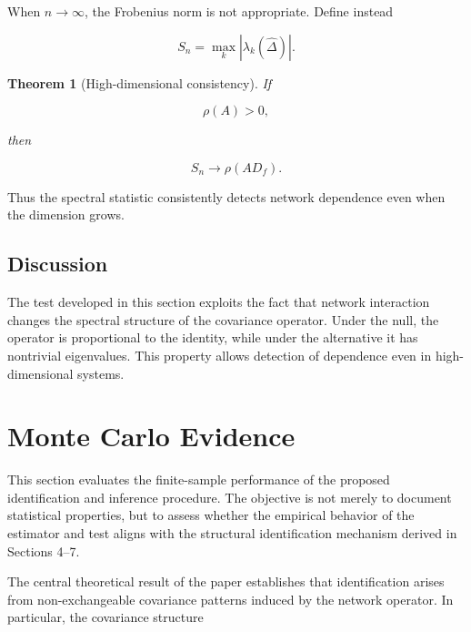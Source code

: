 \documentclass[12pt]{article}
\numberwithin{equation}{section}
\newtheorem{theorem}{Theorem}[section]
\begin{document}
When $n \to \infty$, the Frobenius norm is not appropriate.
Define instead

\begin{equation}
S_n
=
\max_k
|\lambda_k(\hat \Delta)|.
\label{eq:7.high}
\end{equation}

\begin{theorem}[High-dimensional consistency]

If

\begin{equation}
\rho(A) > 0,
\label{eq:7.rho}
\end{equation}

then

\begin{equation}
S_n
\to
\rho(A D_f).
\label{eq:7.speccons}
\end{equation}

\end{theorem}

Thus the spectral statistic consistently detects network dependence even
when the dimension grows.

\subsection{Discussion}

The test developed in this section exploits the fact that network
interaction changes the spectral structure of the covariance operator.
Under the null, the operator is proportional to the identity, while
under the alternative it has nontrivial eigenvalues. This property
allows detection of dependence even in high-dimensional systems.


\section{Monte Carlo Evidence}

This section evaluates the finite-sample performance of the proposed identification and inference procedure. The objective is not merely to document statistical properties, but to assess whether the empirical behavior of the estimator and test aligns with the structural identification mechanism derived in Sections 4--7.

The central theoretical result of the paper establishes that identification arises from non-exchangeable covariance patterns induced by the network operator. In particular, the covariance structure
\end{document}
